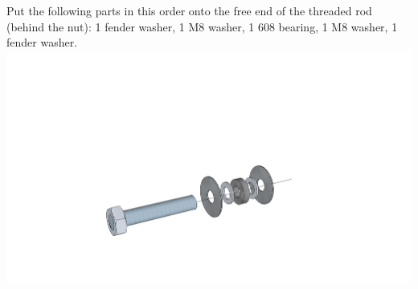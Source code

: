 \documentclass[twoside,a4paper,titlepage]{memoir}
\begin{document}
	\section{}
	Put the following parts in this order onto the free end of the threaded rod (behind the nut): 1 fender
	washer, 1 M8 washer, 1 608 bearing, 1 M8 washer, 1 fender washer.\\
	\includegraphics[width=1\linewidth]{graphics/ch7_10.png}
	
\end{document}
